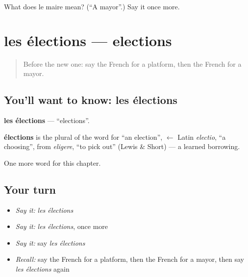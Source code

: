 \begin{tcolorbox}[breakable,colback=teal!4,colframe=teal!35!black,title={Before you move on}]
What does le maire mean? (\textquotedblleft{}A mayor\textquotedblright{}.) Say it once more.
\end{tcolorbox}
\section[les élections]{les élections — elections}

\label{lesson:FR-C248-elections}



\begin{quote}
Before the new one: say the French for a platform, then the French for a mayor.
\end{quote}

\subsection*{You'll want to know: les élections}
\textbf{les élections} — \textquotedblleft{}elections\textquotedblright{}.

\begin{cousinweb}
\textbf{élections} is the plural of the word for \textquotedblleft{}an election\textquotedblright{}, $\leftarrow$ Latin \emph{electio}, \textquotedblleft{}a choosing\textquotedblright{}, from \emph{eligere}, \textquotedblleft{}to pick out\textquotedblright{} (Lewis \& Short) — a learned borrowing.
\end{cousinweb}

\begin{grammarlens}[title={What you've built}]
One more word for this chapter.
\end{grammarlens}

\subsection*{Your turn}
\begin{itemize}
\raggedright
  \item \emph{Say it:} \emph{les élections}
  \item \emph{Say it:} \emph{les élections}, once more
  \item \emph{Say it:} say \emph{les élections}
  \item \emph{Recall:} say the French for a platform, then the French for a mayor, then say \emph{les élections} again
\end{itemize}

